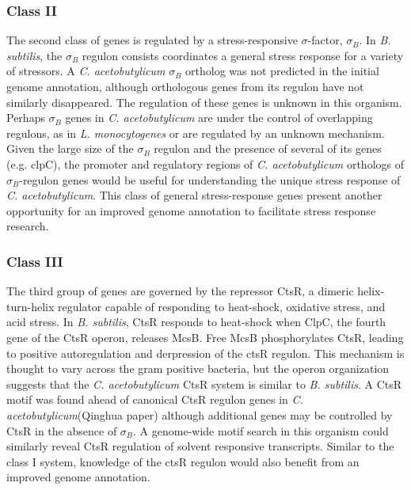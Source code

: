 \subsubsection{Class II}
The second class of genes is regulated by a stress-responsive $\sigma$-factor, $\sigma_{B}$. In \textit{B. subtilis}, the $\sigma_B$ regulon consists coordinates a general stress response for a variety of stressors. A \textit{C. acetobutylicum} $\sigma_{B}$ ortholog was not predicted in the initial genome annotation,\cite{91,42} although orthologous genes from its regulon have not similarly disappeared.\cite{132,133,134,135} The regulation of these genes is unknown in this organism. Perhaps $\sigma_{B}$ genes in \textit{C. acetobutylicum} are under the control of overlapping regulons, as in \textit{L. monocytogenes}\cite{131} or are regulated by an unknown mechanism. Given the large size of the $\sigma_{B}$ regulon and the presence of several of its genes (e.g. clpC\cite{132}), the promoter and regulatory regions of \textit{C. acetobutylicum} orthologs of $\sigma_{B}$-regulon genes would be useful for understanding the unique stress response of \textit{C. acetobutylicum}. This class of general stress-response genes present another opportunity for an improved genome annotation to facilitate stress response research.

\subsubsection{Class III}
The third group of genes are governed by the repressor CtsR, a dimeric helix-turn-helix regulator capable of responding to heat-shock, oxidative stress, and acid stress.\cite{136} In \textit{B. subtilis}, CtsR responds to heat-shock when ClpC, the fourth gene of the CtsR operon, releases McsB.\cite{140} Free McsB phosphorylates CtsR, leading to positive autoregulation and derpression of the ctsR regulon.\cite{137,138,140} This mechanism is thought to vary across the gram positive bacteria,\cite{137} but the operon organization suggests that the \textit{C. acetobutylicum} CtsR system is similar to \textit{B. subtilis}.\cite{42} A CtsR motif was found ahead of canonical CtsR regulon genes in \textit{C. acetobutylicum}(Qinghua paper) although additional genes may be controlled by CtsR in the absence of $\sigma_{B}$. A genome-wide motif search in this organism could similarly reveal CtsR regulation of solvent responsive transcripts. Similar to the class I system, knowledge of the ctsR regulon would also benefit from an improved genome annotation.

